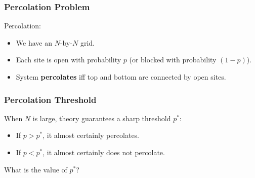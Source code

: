 \documentclass{beamer}
\begin{document}
\begin{frame}%
\frametitle{Percolation Problem}

\scriptsize

\begin{mdframed}[style=exampledefault]
Percolation:
\begin{itemize}
\item We have an $N$-by-$N$ grid.

\item Each site is open with probability $p$ (or blocked with probability $(1-p)$).

\item System \textbf{percolates} iff top and bottom are connected by open sites.

\end{itemize}

\end{mdframed}


\end{frame}

\begin{frame}%
\frametitle{Percolation Threshold}


When $N$ is large, theory guarantees a sharp threshold $p^*$:
\begin{itemize}
\item If $p > p^*$, it almost certainly percolates.

\item If $p < p^*$, it almost certainly does not percolate.
\end{itemize}

\vspace{0.3cm}

What is the value of $p^*$?


\end{frame}
\end{document}
